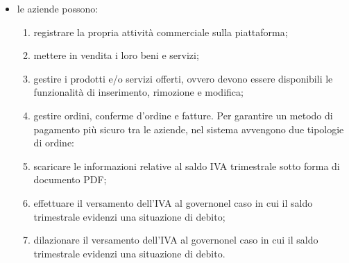 \begin{itemize}
\begin{enumerate}[label=\alph*.]
		\begin{itemize}
			\item \textbf{deposito dei beni}: il cliente, durante il procedimento di acquisto, versa la somma dovuta nella piattaforma, dove verrà momentaneamente trattenuta. Il cliente riceve una conferma d'ordine\glosp nel proprio account, e l'ordine viene aggiunto alle vendite in attesa di conferma dell'azienda-venditrice. La vera fattura conterrà gli stessi dati della conferma d'ordine\glo, ma verrà compilata all'approvazione di quest'ultima, per poterne riportare la data corretta. La compilazione sarà eseguita dal sistema, quindi l'escrow\glosp è da considerarsi già in possesso di entrambi i beni;
			\item \textbf{riscatto beni}: all'approvazione, esplicita o automatica della conferma d'ordine da parte del cliente, esso riceve la fattura, mentre l'azienda-venditrice riceve i soldi trattenuti dal sistema, oltre che al poter accedere alla fattura a sua volta.
		\end{itemize}
		Questo sistema è adottato per garantire che ad ogni ordine il cliente riceva la fattura per dimostrare l'acquisto effettuato, e che l'azienda-venditrice riceva il pagamento. Con l'adozione di tale meccanismo viene semplificata la gestione dell'IVA, in quanto tutte le fatture emesse sono state approvate, e quindi da considerarsi prive di errori. 
	\end{enumerate}
	\item le aziende possono:
	\begin{enumerate}[label=\alph*.]
		\item registrare la propria attività commerciale sulla piattaforma;
		\item mettere in vendita i loro beni e servizi;
		\item gestire i prodotti e/o servizi offerti, ovvero devono essere disponibili le funzionalità di inserimento, rimozione e modifica;
		\item gestire ordini, conferme d'ordine e fatture. Per garantire un metodo di pagamento più sicuro tra le aziende, nel sistema avvengono due tipologie di ordine:
		
	
		\item scaricare le informazioni relative al saldo IVA trimestrale sotto forma di documento PDF;
		\item effettuare il versamento dell'IVA al governo\glosp nel caso in cui il saldo trimestrale evidenzi una situazione di debito;
		\item dilazionare il versamento dell'IVA al governo\glosp nel caso in cui il saldo trimestrale evidenzi una situazione di debito.
	\end{enumerate}

\end{itemize}
